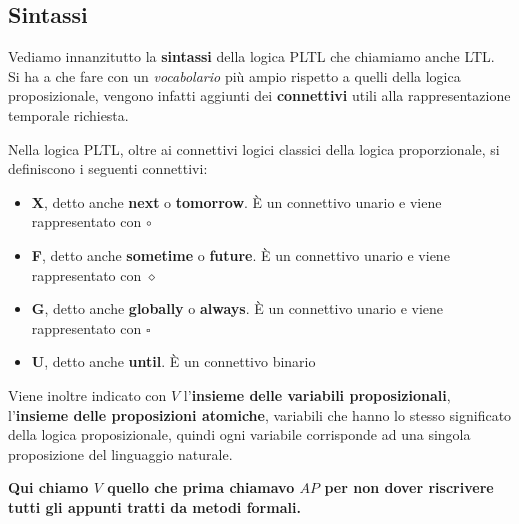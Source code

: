 \subsection{Sintassi}
Vediamo innanzitutto la \textbf{sintassi} della logica PLTL che chiamiamo anche
LTL.\\
Si ha a che fare con un \textit{vocabolario} più ampio rispetto a quelli della
logica proposizionale, vengono infatti aggiunti dei \textbf{connettivi} utili
alla rappresentazione temporale richiesta.
\begin{definizione}
  Nella logica PLTL, oltre ai connettivi logici classici della logica
  proporzionale, si definiscono i seguenti connettivi:
  \begin{itemize}
    \item \textbf{X}, detto anche \textbf{next} o \textbf{tomorrow}. È un
    connettivo unario e viene rappresentato con $\circ$
    \item \textbf{F}, detto anche \textbf{sometime} o \textbf{future}. È un
    connettivo unario e viene rappresentato con $\diamond$
    \item \textbf{G}, detto anche \textbf{globally} o \textbf{always}. È un
    connettivo unario e viene rappresentato con $\square$
    \item \textbf{U}, detto anche \textbf{until}. È un connettivo binario
  \end{itemize}
  Viene inoltre indicato con $V$ l'\textbf{insieme delle variabili
    proposizionali}, l'\textbf{insieme delle proposizioni atomiche},
  variabili che hanno lo stesso significato della logica
  proposizionale, quindi ogni variabile corrisponde ad una singola proposizione
  del linguaggio naturale. 
\end{definizione}
\textbf{Qui chiamo $V$ quello che prima chiamavo $AP$ per non dover riscrivere
  tutti gli appunti tratti da metodi formali.\\}
